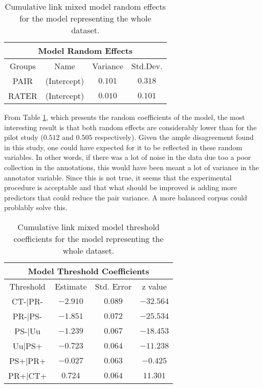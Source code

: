 \begin{table}
\center
\begin{tabular}{|c|c|c|c|}
\hline
\multicolumn{4}{|c|}{Model Random Effects}\\\hline
Groups  &  Name       &  Variance & Std.Dev.\\\hline
 PAIR  & (Intercept) & $0.101$ &$0.318$\\\hline  
 RATER & (Intercept) & $0.010$ &$0.101$\\\hline  
\end{tabular}
\caption[Model Random Effects.]{Cumulative link mixed model random effects for the model representing the whole dataset.}
\label{tab:modrand}
\end{table}

From Table \ref{tab:modrand}, which presents the random coefficients of the model, the most interesting result is that both random effects are considerably lower than for the pilot study ($0.512$ and $0.505$ respectively). Given the ample disagreement found in this study, one could have expected for it to be reflected in these random variables. In other words, if there was a lot of noise in the data due too a poor collection in the annotations, this would have been meant a lot of variance in the annotator variable. Since this is not true, it seems that the experimental procedure is acceptable and that what should be improved is adding more predictors that could reduce the pair variance. A more balanced corpus could problably solve this.\\ 

\begin{table}
\center
\begin{tabular}{|c|c|c|c|}
\hline
\multicolumn{4}{|c|}{Model Threshold Coefficients}\\\hline
Threshold &  Estimate & Std. Error & z value\\\hline
CT-|PR- &$-2.910$ &$0.089$ &$-32.564$\\\hline
PR-|PS- &$-1.851$ &$0.072$ &$-25.534$\\\hline
PS-|Uu  &$-1.239$ &$0.067$ &$-18.453$\\\hline
Uu|PS+  &$-0.723$ &$0.064$ &$-11.238$\\\hline
PS+|PR+ &$-0.027$ &$0.063$ &$ -0.425$\\\hline
PR+|CT+ &$ 0.724$ &$0.064$ &$ 11.301$\\\hline
\end{tabular}
\caption[Model Threshold Coefficients.]{Cumulative link mixed model threshold coefficients for the model representing the whole dataset.}
\label{tab:modthres}
\end{table}

